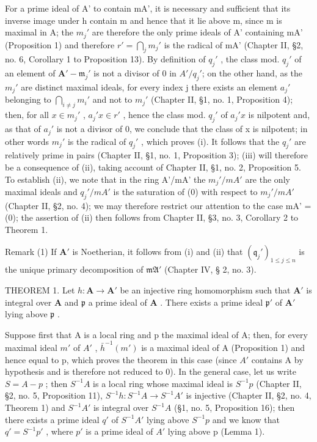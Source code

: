 For a prime ideal of A' to contain mA', it is necessary and sufficient that its inverse image under h contain m and hence that it lie above m, since m is maximal in A; the \(m_{j}'\) are therefore the only prime ideals of A' containing mA' (Proposition 1) and therefore \(r' = \bigcap_{j} m_{j}'\) is the radical of mA' (Chapter II, §2, no. 6, Corollary 1 to Proposition 13). By definition of \(q_{j}'\) , the class mod. \(q_{j}'\) of an element of \(\mathbf{A}' - \mathfrak{m}_{j}'\) is not a divisor of 0 in \(A'/q_{j}'\); on the other hand, as the \(m_{j}'\) are distinct maximal ideals, for every index j there exists an element \(a_{j}'\) belonging to \(\bigcap_{i \neq j} m_{i}'\) and not to \(m_{j}'\) (Chapter II, §1, no. 1, Proposition 4); then, for all \(x \in m_{j}'\) , \(a_{j}'x \in r'\) , hence the class mod. \(q_{j}'\) of \(a_{j}'x\) is nilpotent and, as that of \(a_{j}'\) is not a divisor of 0, we conclude that the class of x is nilpotent; in other words \(m_{j}'\) is the radical of \(q_{j}'\) , which proves (i). It follows that the \(q_{j}'\) are relatively prime in pairs (Chapter II, §1, no. 1, Proposition 3); (iii) will therefore be a consequence of (ii), taking account of Chapter II, §1, no. 2, Proposition 5. To establish (ii), we note that in the ring A'/mA' the \(m_{j}'/mA'\) are the only maximal ideals and \(q_{j}'/mA'\) is the saturation of (0) with respect to \(m_{j}'/mA'\) (Chapter II, §2, no. 4); we may therefore restrict our attention to the case mA' = (0); the assertion of (ii) then follows from Chapter II, §3, no. 3, Corollary 2 to Theorem 1.

Remark (1) If \(\mathbf{A}'\) is Noetherian, it follows from (i) and (ii) that \((\mathfrak{q}_j')_{1 \leqslant j \leqslant n}\) is the unique primary decomposition of \(\mathfrak{mA}'\) (Chapter IV, § 2, no. 3).

THEOREM 1. Let \(h: \mathbf{A} \to \mathbf{A}'\) be an injective ring homomorphism such that \(\mathbf{A}'\) is integral over \(\mathbf{A}\) and \(\mathfrak{p}\) a prime ideal of \(\mathbf{A}\) . There exists a prime ideal \(\mathfrak{p}'\) of \(\mathbf{A}'\) lying above \(\mathfrak{p}\) .

Suppose first that A is a local ring and p the maximal ideal of A; then, for every maximal ideal \(m'\) of \(A'\) , \(\bar{h}^{-1}(m')\) is a maximal ideal of A (Proposition 1) and hence equal to p, which proves the theorem in this case (since \(A'\) contains A by hypothesis and is therefore not reduced to 0). In the general case, let us write \(S = A - p\) ; then \(S^{-1}A\) is a local ring whose maximal ideal is \(S^{-1}p\) (Chapter II, §2, no. 5, Proposition 11), \(S^{-1}h: S^{-1}A \to S^{-1}A'\) is injective (Chapter II, §2, no. 4, Theorem 1) and \(S^{-1}A'\) is integral over \(S^{-1}A\) (§1, no. 5, Proposition 16); then there exists a prime ideal \(q'\) of \(S^{-1}A'\) lying above \(S^{-1}p\) and we know that \(q' = S^{-1}p'\) , where \(p'\) is a prime ideal of \(A'\) lying above p (Lemma 1).

